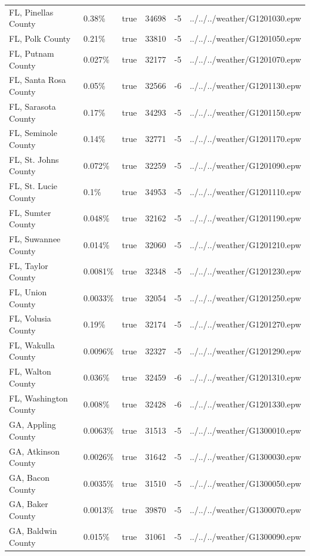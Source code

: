 \begin{longtable}[]{@{}llllll@{}}
FL, Pinellas County & 0.38\% & true & 34698 & -5 &
../../../weather/G1201030.epw \\
FL, Polk County & 0.21\% & true & 33810 & -5 &
../../../weather/G1201050.epw \\
FL, Putnam County & 0.027\% & true & 32177 & -5 &
../../../weather/G1201070.epw \\
FL, Santa Rosa County & 0.05\% & true & 32566 & -6 &
../../../weather/G1201130.epw \\
FL, Sarasota County & 0.17\% & true & 34293 & -5 &
../../../weather/G1201150.epw \\
FL, Seminole County & 0.14\% & true & 32771 & -5 &
../../../weather/G1201170.epw \\
FL, St. Johns County & 0.072\% & true & 32259 & -5 &
../../../weather/G1201090.epw \\
FL, St. Lucie County & 0.1\% & true & 34953 & -5 &
../../../weather/G1201110.epw \\
FL, Sumter County & 0.048\% & true & 32162 & -5 &
../../../weather/G1201190.epw \\
FL, Suwannee County & 0.014\% & true & 32060 & -5 &
../../../weather/G1201210.epw \\
FL, Taylor County & 0.0081\% & true & 32348 & -5 &
../../../weather/G1201230.epw \\
FL, Union County & 0.0033\% & true & 32054 & -5 &
../../../weather/G1201250.epw \\
FL, Volusia County & 0.19\% & true & 32174 & -5 &
../../../weather/G1201270.epw \\
FL, Wakulla County & 0.0096\% & true & 32327 & -5 &
../../../weather/G1201290.epw \\
FL, Walton County & 0.036\% & true & 32459 & -6 &
../../../weather/G1201310.epw \\
FL, Washington County & 0.008\% & true & 32428 & -6 &
../../../weather/G1201330.epw \\
GA, Appling County & 0.0063\% & true & 31513 & -5 &
../../../weather/G1300010.epw \\
GA, Atkinson County & 0.0026\% & true & 31642 & -5 &
../../../weather/G1300030.epw \\
GA, Bacon County & 0.0035\% & true & 31510 & -5 &
../../../weather/G1300050.epw \\
GA, Baker County & 0.0013\% & true & 39870 & -5 &
../../../weather/G1300070.epw \\
GA, Baldwin County & 0.015\% & true & 31061 & -5 &
../../../weather/G1300090.epw \\

\end{longtable}
